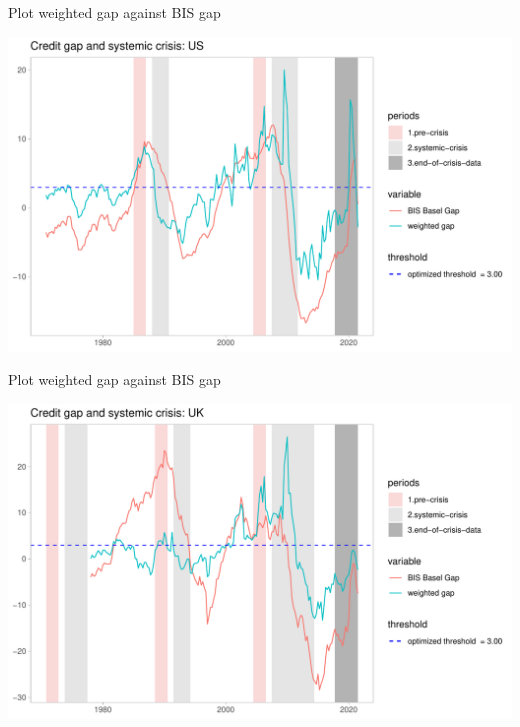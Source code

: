 \documentclass[
  ignorenonframetext,
]{beamer}
\begin{document}
\begin{frame}{Plot weighted gap against BIS gap}
\protect\hypertarget{plot-weighted-gap-against-bis-gap}{}
\begin{center}\includegraphics[width=1\linewidth]{../Data/Output/Graphs/Weighted_credit_gap_US} \end{center}
\end{frame}

\begin{frame}{Plot weighted gap against BIS gap}
\protect\hypertarget{plot-weighted-gap-against-bis-gap-1}{}
\begin{center}\includegraphics[width=1\linewidth]{../Data/Output/Graphs/Weighted_credit_gap_UK} \end{center}
\end{frame}
\end{document}
